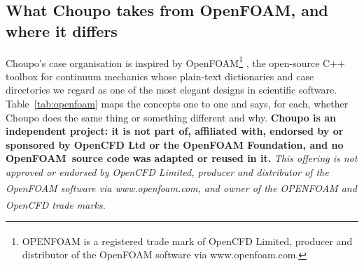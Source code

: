 \documentclass[11pt,a4paper]{article}
\newcommand{\OF}{OpenFOAM}
\begin{document}
\subsection{What Choupo takes from \OF, and where it differs}
\label{sec:openfoam}

Choupo's case organisation is inspired by
\OF\textsuperscript{\textregistered}\footnote{OPENFOAM\textsuperscript{\textregistered}
is a registered trade mark of OpenCFD Limited, producer and distributor of
the OpenFOAM software via www.openfoam.com.}
\citep{weller1998}, the open-source C++ toolbox for continuum mechanics
whose plain-text dictionaries and case directories we regard as one of the
most elegant designs in scientific software.  Table~\ref{tab:openfoam} maps
the concepts one to one and says, for each, whether Choupo does the same
thing or something different and why.  \textbf{Choupo is an independent
project: it is not part of, affiliated with, endorsed by or sponsored by
OpenCFD Ltd or the OpenFOAM Foundation, and no \OF\ source code was adapted
or reused in it.}  \emph{This offering is not approved or endorsed by
OpenCFD Limited, producer and distributor of the OpenFOAM software via
www.openfoam.com, and owner of the OPENFOAM\textsuperscript{\textregistered}
and OpenCFD\textsuperscript{\textregistered} trade marks.}
\end{document}
